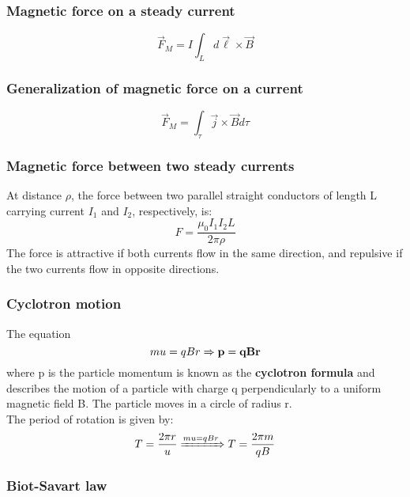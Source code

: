 \documentclass[english,11pt]{article}
\begin{document}
\subsubsection*{\bf Magnetic force on a steady current}
\begin{equation*}
  \vec{F}_{M} = I \int_{L} d\vec{\ell} \times \vec{B}
\end{equation*}

\subsubsection*{\bf Generalization of magnetic force on a current}
\begin{equation*}
  \vec{F}_{M} =  \int_{\tau} \vec{j} \times \vec{B} d\tau
\end{equation*}


\subsubsection*{\bf Magnetic force between two steady currents}
At distance $\rho$, the force between two parallel straight
conductors of length L carrying current $I_1$ and $I_2$,
respectively, is:
\begin{equation*}
  F = \frac{\mu_0 I_{1} I_{2} L}{2\pi \rho}
\end{equation*}
The force is attractive if both currents flow in the same direction, and
repulsive if the two currents flow in opposite directions.

\subsubsection*{\bf Cyclotron motion}

The equation
\begin{equation*}
  m u = q B r \Rightarrow
  {\bf p = qBr}
\end{equation*}
where p is the particle momentum
is known as the {\bf cyclotron formula} and describes the motion of a particle with charge q
perpendicularly to a uniform magnetic field B.
The particle moves in a circle of radius r.\\

The period of rotation is given by:
\begin{equation*}
  T = \frac{2\pi r}{u} \xRightarrow{m u = q B r}
  T = \frac{2\pi m}{q B}
\end{equation*}

\subsubsection*{\bf Biot-Savart law}
\end{document}
